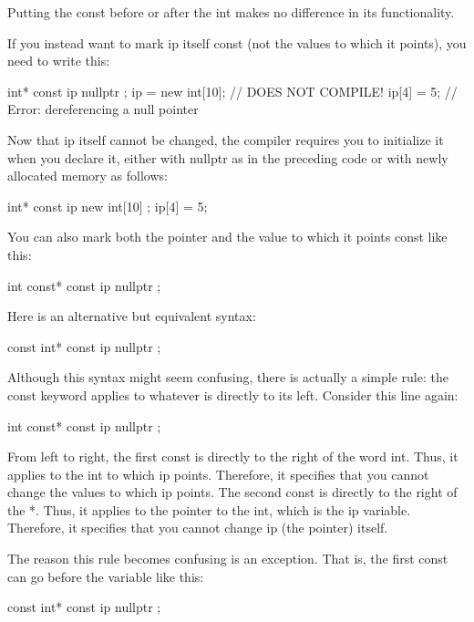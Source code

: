 Putting the const before or after the int makes no difference in its functionality.

If you instead want to mark ip itself const (not the values to which it points), you need to write this:

\begin{cpp}
int* const ip { nullptr };
ip = new int[10]; // DOES NOT COMPILE!
ip[4] = 5; // Error: dereferencing a null pointer
\end{cpp}

Now that ip itself cannot be changed, the compiler requires you to initialize it when you declare it, either with nullptr as in the preceding code or with newly allocated memory as follows:

\begin{cpp}
int* const ip { new int[10] };
ip[4] = 5;
\end{cpp}

You can also mark both the pointer and the value to which it points const like this:

\begin{cpp}
int const* const ip { nullptr };
\end{cpp}

Here is an alternative but equivalent syntax:

\begin{cpp}
const int* const ip { nullptr };
\end{cpp}

Although this syntax might seem confusing, there is actually a simple rule: the const keyword applies to whatever is directly to its left. Consider this line again:

\begin{cpp}
int const* const ip { nullptr };
\end{cpp}

From left to right, the first const is directly to the right of the word int. Thus, it applies to the int to which ip points. Therefore, it specifies that you cannot change the values to which ip points. The second const is directly to the right of the *. Thus, it applies to the pointer to the int, which is the ip variable. Therefore, it specifies that you cannot change ip (the pointer) itself.

The reason this rule becomes confusing is an exception. That is, the first const can go before the variable like this:

\begin{cpp}
const int* const ip { nullptr };
\end{cpp}

